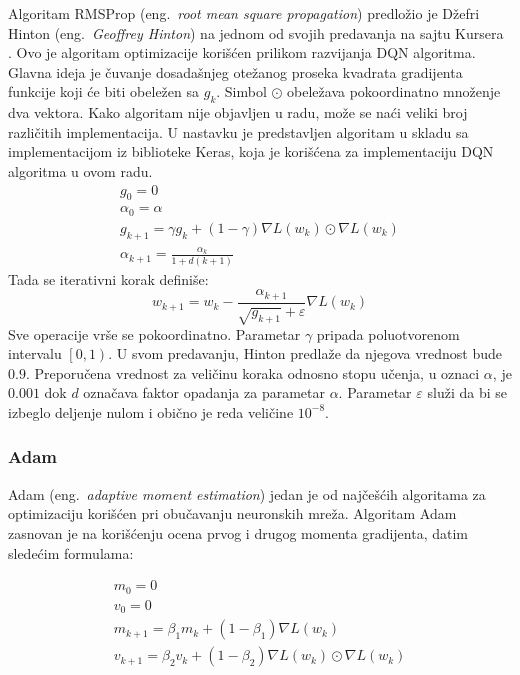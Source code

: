 Algoritam RMSProp (eng.~{\em root mean square propagation}) predložio je Džefri Hinton (eng.~{\em Geoffrey Hinton}) na jednom od svojih predavanja na sajtu Kursera \cite{rmsprop}. Ovo je algoritam optimizacije korišćen prilikom razvijanja DQN algoritma. Glavna ideja je čuvanje dosadašnjeg otežanog proseka kvadrata gradijenta funkcije koji će biti obeležen sa $g_k$. Simbol $\odot$ obeležava pokoordinatno množenje dva vektora. Kako algoritam nije objavljen u radu, može se naći veliki broj različitih implementacija. U nastavku je predstavljen algoritam u skladu sa implementacijom iz biblioteke Keras, koja je korišćena za implementaciju DQN algoritma u ovom radu.
\begin{equation}
	\begin{gathered}
		g_0 = 0 \\
		\alpha_0 = \alpha \\
		g_{k+1} = \gamma g_k + (1 - \gamma)\nabla L(w_k) \odot \nabla L(w_k) \\
		\alpha_{k+1} = \frac{\alpha_k}{1+d(k+1)}	
	\end{gathered}
\end{equation}
Tada se iterativni korak definiše: 
\begin{equation}
	w_{k+1} = w_k - \frac{\alpha_{k+1}}{\sqrt{g_{k+1}} + \varepsilon} \nabla L(w_k)
\end{equation}
Sve operacije vrše se pokoordinatno. Parametar $\gamma$ pripada poluotvorenom intervalu $\left[0, 1\right) $. U svom predavanju, Hinton predlaže da njegova vrednost bude $0.9$. Preporučena vrednost za veličinu koraka odnosno stopu učenja, u oznaci $\alpha$, je $0.001$ dok $d$ označava faktor opadanja za parametar $\alpha$. Parametar $\varepsilon$ služi da bi se izbeglo deljenje nulom i obično je reda veličine $10^{-8}$.

\subsubsection{Adam}

Adam (eng.~{\em adaptive moment estimation}) jedan je od najčešćih algoritama za optimizaciju korišćen pri obučavanju neuronskih mreža. Algoritam Adam zasnovan je na korišćenju ocena prvog i drugog momenta gradijenta, datim sledećim formulama:

\begin{equation}
	\begin{gathered}
			m_0 = 0 \\
			v_0 = 0 \\ 
			m_{k+1} = \beta_1 m_k + (1-\beta_1) \nabla L(w_k) \\
			v_{k+1} = \beta_2 v_k + (1-\beta_2) \nabla L(w_k) \odot \nabla L(w_k) 
	\end{gathered}
\end{equation}


